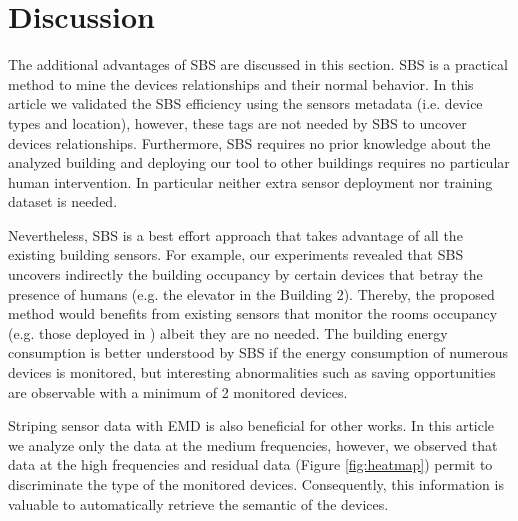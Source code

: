 \section{Discussion}
The additional advantages of SBS are discussed in this section.
SBS is a practical method to mine the devices relationships and their normal behavior. 
In this article we validated the SBS efficiency using the sensors metadata (i.e. device types and location), however, these tags are not needed by SBS to uncover devices relationships.
Furthermore, SBS requires no prior knowledge about the analyzed building and deploying our tool to other buildings requires no particular human intervention.
In particular neither extra sensor deployment nor training dataset is needed. 

Nevertheless, SBS is a best effort approach that takes advantage of all the existing building sensors.
For example, our experiments revealed that SBS uncovers indirectly the building occupancy by certain devices that betray the presence of humans (e.g. the elevator in the Building 2). 
Thereby, the proposed method would benefits from existing sensors that monitor the rooms occupancy (e.g. those deployed in \cite{agarwal:ipsn2011,erickson:ipsn2011}) albeit they are no needed.
The building energy consumption is better understood by SBS if the energy consumption of numerous devices is monitored, 
but interesting abnormalities such as saving opportunities are observable with a minimum of 2 monitored devices.

Striping sensor data with EMD is also beneficial for other works.
In this article we analyze only the data at the medium frequencies, however, we observed that data at the high frequencies and residual data (Figure \ref{fig:heatmap}) permit to discriminate the type of the monitored devices.
Consequently, this information is valuable to automatically retrieve the semantic of the devices.


% 
% 
